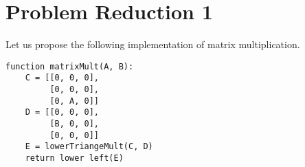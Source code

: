 \documentclass{article}
\providecommand{\prob}[1]{\section*{Problem #1}}
\begin{document}
\pagebreak
\prob{Reduction 1}
Let us propose the following implementation of matrix multiplication.
\begin{lstlisting}
function matrixMult(A, B):
    C = [[0, 0, 0],
         [0, 0, 0],
         [0, A, 0]]
    D = [[0, 0, 0],
         [B, 0, 0],
         [0, 0, 0]]
    E = lowerTriangeMult(C, D)
    return lower left(E)
\end{lstlisting}
\end{document}
